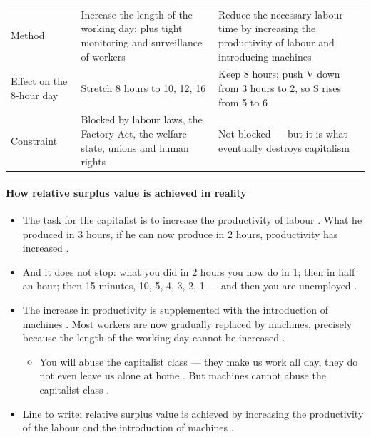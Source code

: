 \begin{table}[h!]
\centering
\begin{tabularx}{\textwidth}{lYY}
\toprule
{}
\thead{} &  &  \\
\midrule
Method & Increase the length of the working day; plus tight monitoring and surveillance of workers & Reduce the necessary labour time by increasing the productivity of labour and introducing machines \\
Effect on the 8-hour day & Stretch 8 hours to 10, 12, 16 & Keep 8 hours; push V down from 3 hours to 2, so S rises from 5 to 6 \\
Constraint & Blocked by labour laws, the Factory Act, the welfare state, unions and human rights & Not blocked --- but it is what eventually destroys capitalism \\
\bottomrule
\end{tabularx}
\end{table}

\paragraph{How relative surplus value is achieved in reality}
\begin{itemize}
    \item The task for the capitalist is to increase the productivity of labour . What he produced in 3 hours, if he can now produce in 2 hours, productivity has increased .
    \item And it does not stop: what you did in 2 hours you now do in 1; then in half an hour; then 15 minutes, 10, 5, 4, 3, 2, 1 --- and then you are unemployed .
    \item The increase in productivity is supplemented with the introduction of machines . Most workers are now gradually replaced by machines, precisely because the length of the working day cannot be increased .
    \begin{itemize}
        \item You will abuse the capitalist class --- they make us work all day, they do not even leave us alone at home . But machines cannot abuse the capitalist class .
    \end{itemize}
    \item Line to write: relative surplus value is achieved by increasing the productivity of the labour and the introduction of machines .
\end{itemize}

